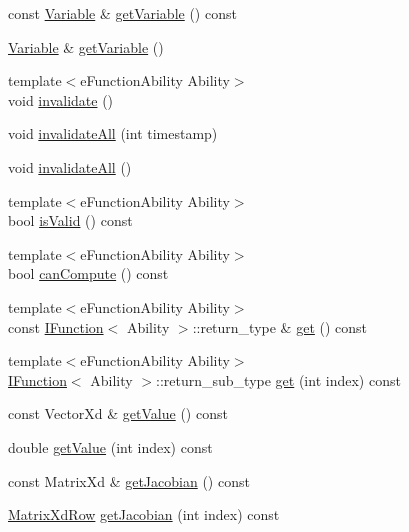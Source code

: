 \begin{DoxyCompactItemize}
\item 
const \hyperlink{classocra_1_1Variable}{Variable} \& \hyperlink{classocra_1_1Function_a6748e5c8a2bb40655bf574baac33dfdd}{get\+Variable} () const
\item 
\hyperlink{classocra_1_1Variable}{Variable} \& \hyperlink{classocra_1_1Function_a2528d95d06e21e60eff14bb3ee484345}{get\+Variable} ()
\item 
{\footnotesize template$<$e\+Function\+Ability Ability$>$ }\\void \hyperlink{classocra_1_1Function_aa66bc14ed8c17e88224fa2469d7d3a7e}{invalidate} ()
\item 
void \hyperlink{classocra_1_1Function_ae33c94ee0c807b05869609f7a166ff82}{invalidate\+All} (int timestamp)
\item 
void \hyperlink{classocra_1_1Function_a2ebd8ade069fc19b03e6ab9cef2c09c3}{invalidate\+All} ()
\item 
{\footnotesize template$<$e\+Function\+Ability Ability$>$ }\\bool \hyperlink{classocra_1_1Function_a277bdd8c1ece035f5ab5fc2b996ddced}{is\+Valid} () const
\item 
{\footnotesize template$<$e\+Function\+Ability Ability$>$ }\\bool \hyperlink{classocra_1_1Function_a9483d0d23002c7e1a20033e6ea224e2d}{can\+Compute} () const
\item 
{\footnotesize template$<$e\+Function\+Ability Ability$>$ }\\const \hyperlink{classocra_1_1IFunction}{I\+Function}$<$ Ability $>$\+::return\+\_\+type \& \hyperlink{classocra_1_1Function_a244404069d9ab169fbb23309785693b8}{get} () const
\item 
{\footnotesize template$<$e\+Function\+Ability Ability$>$ }\\\hyperlink{classocra_1_1IFunction}{I\+Function}$<$ Ability $>$\+::return\+\_\+sub\+\_\+type \hyperlink{classocra_1_1Function_add7bf02dbd416bd2f9fab547566fc6ed}{get} (int index) const
\item 
const Vector\+Xd \& \hyperlink{classocra_1_1Function_a0b8c9f91088218ca55e73679e8c56e87}{get\+Value} () const
\item 
double \hyperlink{classocra_1_1Function_a4447b2e6194552d6536f37f0156b9c29}{get\+Value} (int index) const
\item 
const Matrix\+Xd \& \hyperlink{classocra_1_1Function_a14d855bebcf8a03878c0ff7857b27d37}{get\+Jacobian} () const
\item 
\hyperlink{namespaceocra_a608bf0522317ed1df3bbfc6a5753bc01}{Matrix\+Xd\+Row} \hyperlink{classocra_1_1Function_a1e0bdc0fd8b5aa7e7a29076858a5d28c}{get\+Jacobian} (int index) const
\end{DoxyCompactItemize}

